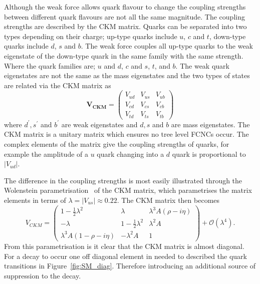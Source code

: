 

Although the weak force allows quark flavour to change the coupling strengths between different quark flavours are not all the same magnitude. The coupling strengths are described by the CKM matrix. Quarks can be separated into two types depending on their charge; up-type quarks include $u$, $c$ and $t$, down-type quarks include $d$, $s$ and $b$. The weak force couples all up-type quarks to the weak eigenstate of the down-type quark in the same family with the same strength. Where the quark families are; $u$ and $d$, $c$ and $s$, $t$, and $b$. The weak quark eigenstates are not the same as the mass eigenstates and the two types of states are related via the CKM matrix as
\begin{equation}
\mathbf{V_{CKM}} =
 \begin{pmatrix}
   V_{ud} & V_{us} & V_{ub} \\
   V_{cd} & V_{cs} & V_{cb} \\
   V_{td} & V_{ts} & V_{tb}
 \end{pmatrix}
\label{eq:CKMA}
\end{equation}
where $d^', s^'$ and $b^'$ are weak eigenstates and $d, s$ and $b$ are mass eigenstates. The CKM matrix is a unitary matrix which ensures no tree level FCNCs occur. The complex elements of the matrix give the coupling strengths of quarks, for example the amplitude of a $u$ quark changing into a $d$ quark is proportional to $|V_{ud}|$.

The difference in the coupling strengths is most easily illustrated through the Wolenstein parametrisation~\cite{} of the CKM matrix, which parametrises the matrix elements in terms of $\lambda = |V_{us}| \approx 0.22$. The CKM matrix then becomes
\begin{equation}
V_{CKM} =
 \begin{pmatrix}
 1 - \frac{1}{2}\lambda^2 & \lambda & \lambda^3 A (\rho - i \eta) \\
 - \lambda                & 1 - \frac{1}{2}\lambda^2 & \lambda^2 A \\
 \lambda^3 A (1 - \rho- i \eta) & -\lambda^2 A & 1
 \end{pmatrix} + \mathcal{O}(\lambda^4).
\label{eq:CKMB}
\end{equation}
From this parametrisation is it clear that the CKM matrix is almost diagonal. For a \bmumu decay to occur one off diagonal element in needed to described the quark transitions in Figure~\ref{fig:SM_diag}. Therefore introducing an additional source of suppression to the decay. 

